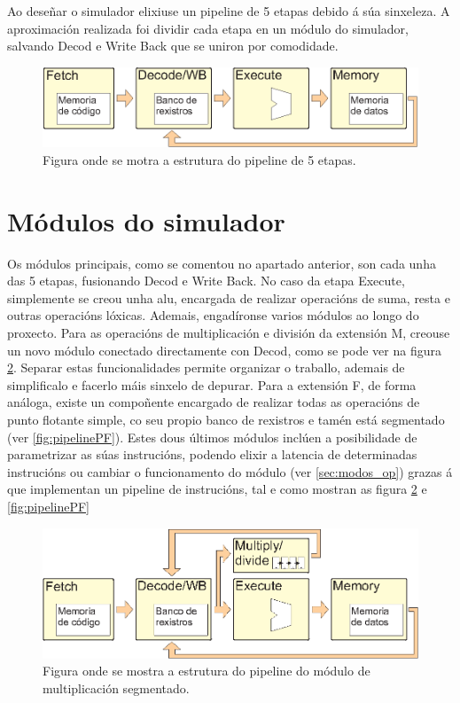 Ao deseñar o simulador elixiuse un pipeline de 5 etapas debido á súa sinxeleza. A aproximación realizada foi dividir cada etapa en un módulo do simulador, salvando Decod e Write Back que se uniron por comodidade.

\begin{figure}[hp!]
  \centering
  \includegraphics[width=\textwidth]{imaxes/pipeline5etapas.EPS}
  \caption{Figura onde se motra a estrutura do pipeline de 5 etapas.}
  \label{fig:pipeline5etapas}
\end{figure}

\section{Módulos do simulador}\label{sec:modulo_sim}
Os módulos principais, como se comentou no apartado anterior, son cada unha das 5 etapas, fusionando Decod e Write Back. No caso da etapa Execute, simplemente se creou unha \acrshort{alu}, encargada de realizar operacións de suma, resta e outras operacións lóxicas. Ademais, engadíronse varios módulos ao longo do proxecto. Para as operacións de multiplicación e división da extensión M, creouse un novo módulo conectado directamente con Decod, como se pode ver na figura \ref{fig:pipelineMultSegm}. Separar estas funcionalidades permite organizar o traballo, ademais de simplificalo e facerlo máis sinxelo de depurar. Para a extensión F, de forma análoga, existe un compoñente encargado de realizar todas as operacións de punto flotante simple, co seu propio banco de rexistros e tamén está segmentado (ver \ref{fig:pipelinePF}). Estes dous últimos módulos inclúen a posibilidade de parametrizar as súas instrucións, podendo elixir a latencia de determinadas instrucións ou cambiar o funcionamento do módulo (ver \ref{sec:modos_op}) grazas á que implementan un pipeline de instrucións, tal e como mostran as figura \ref{fig:pipelineMultSegm} e \ref{fig:pipelinePF}

\begin{figure}[hp!]
  \centering
  \includegraphics[width=\textwidth]{imaxes/pipelineMultSegm.EPS}
  \caption{Figura onde se mostra a estrutura do pipeline do módulo de multiplicación segmentado.}
  \label{fig:pipelineMultSegm}
\end{figure}

